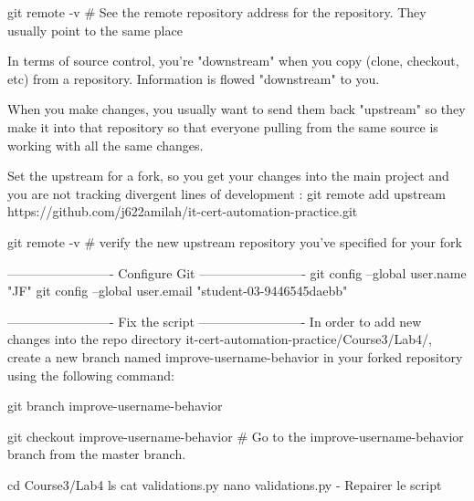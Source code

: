 \documentclass[11pt, onecolumn]{article}
\begin{document}
git remote -v    # See the remote repository address for the repository. They usually point to the same place

In terms of source control, you're "downstream" when you copy (clone, checkout, etc) from a repository. Information is flowed "downstream" to you.

When you make changes, you usually want to send them back "upstream" so they make it into that repository so that everyone pulling from the same source is working with all the same changes. 


Set the upstream for a fork, so you get your changes into the main project and you are not tracking divergent lines of development : 
git remote add upstream https://github.com/j622amilah/it-cert-automation-practice.git

git remote -v     # verify the new upstream repository you've specified for your fork


-------------------------
Configure Git
-------------------------
git config --global user.name "JF"
git config --global user.email "student-03-9446545daebb"


-------------------------
Fix the script
-------------------------
In order to add new changes into the repo directory it-cert-automation-practice/Course3/Lab4/, create a new branch named improve-username-behavior in your forked repository using the following command:

git branch improve-username-behavior

git checkout improve-username-behavior   # Go to the improve-username-behavior branch from the master branch.

cd Course3/Lab4
ls
cat validations.py
nano validations.py
- Repairer le script





\end{document}
